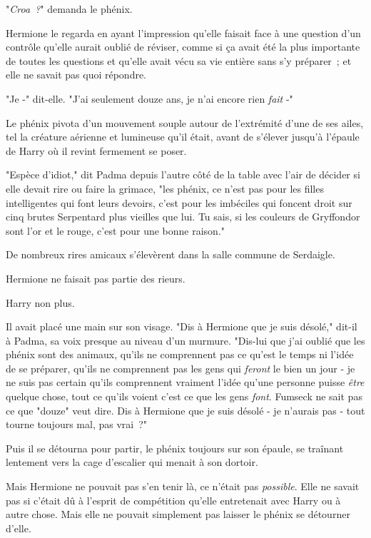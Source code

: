 "\emph{Croa~?}" demanda le phénix.

Hermione le regarda en ayant l'impression qu'elle faisait face à une question d'un contrôle qu'elle aurait oublié de réviser, comme si ça avait été la plus importante de toutes les questions et qu'elle avait vécu sa vie entière sans s'y préparer~; et elle ne savait pas quoi répondre.

"Je -" dit-elle. "J'ai seulement douze ans, je n'ai encore rien \emph{fait} -"

Le phénix pivota d'un mouvement souple autour de l'extrémité d'une de ses ailes, tel la créature aérienne et lumineuse qu'il était, avant de s'élever jusqu'à l'épaule de Harry où il revint fermement se poser.

"Espèce d'idiot," dit Padma depuis l'autre côté de la table avec l'air de décider si elle devait rire ou faire la grimace, "les phénix, ce n'est pas pour les filles intelligentes qui font leurs devoirs, c'est pour les imbéciles qui foncent droit sur cinq brutes Serpentard plus vieilles que lui. Tu sais, si les couleurs de Gryffondor sont l'or et le rouge, c'est pour une bonne raison."

De nombreux rires amicaux s'élevèrent dans la salle commune de Serdaigle.

Hermione ne faisait pas partie des rieurs.

Harry non plus.

Il avait placé une main sur son visage. "Dis à Hermione que je suis désolé," dit-il à Padma, sa voix presque au niveau d'un murmure. "Dis-lui que j'ai oublié que les phénix sont des animaux, qu'ils ne comprennent pas ce qu'est le temps ni l'idée de se préparer, qu'ils ne comprennent pas les gens qui \emph{feront} le bien un jour - je ne suis pas certain qu'ils comprennent vraiment l'idée qu'une personne puisse \emph{être} quelque chose, tout ce qu'ils voient c'est ce que les gens \emph{font}. Fumseck ne sait pas ce que "douze" veut dire. Dis à Hermione que je suis désolé - je n'aurais pas - tout tourne toujours mal, pas vrai~?"

Puis il se détourna pour partir, le phénix toujours sur son épaule, se traînant lentement vers la cage d'escalier qui menait à son dortoir.

Mais Hermione ne pouvait pas s'en tenir là, ce n'était pas \emph{possible}. Elle ne savait pas si c'était dû à l'esprit de compétition qu'elle entretenait avec Harry ou à autre chose. Mais elle ne pouvait simplement pas laisser le phénix se détourner d'elle.

